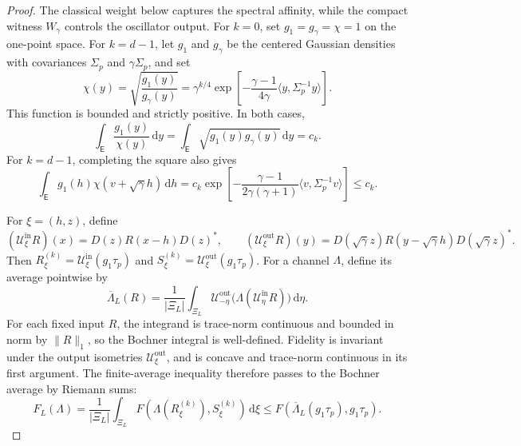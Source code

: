 \documentclass[11pt]{article}
\theoremstyle{remark}
\theoremstyle{plain}
\newcommand{\dd}{\mathrm d}
\begin{document}
\begin{proof}
The classical weight below captures the spectral
affinity, while the compact witness \(W_\gamma\) controls the oscillator
output.
For \(k=0\), set \(g_1=g_\gamma=\chi=1\) on the one-point space.  For
\(k=d-1\), let \(g_1\) and \(g_\gamma\) be the centered Gaussian densities
with covariances \(\Sigma_p\) and \(\gamma\Sigma_p\), and set
\[
  \chi(y)=\sqrt{\frac{g_1(y)}{g_\gamma(y)}}
  =\gamma^{k/4}
   \exp\!\left[-\frac{\gamma-1}{4\gamma}
     \langle y,\Sigma_p^{-1}y\rangle\right].
\]
This function is bounded and strictly positive.  In both cases,
\begin{equation}\label{eq:classical-witness-identity}
  \int_{\mathsf E}\frac{g_1(y)}{\chi(y)}\,\dd y
  =\int_{\mathsf E}\sqrt{g_1(y)g_\gamma(y)}\,\dd y
  =c_k.
\end{equation}
For \(k=d-1\), completing the square also gives
\begin{equation}\label{eq:classical-witness-translation}
  \int_{\mathsf E}g_1(h)\chi(v+\sqrt\gamma h)\,\dd h
  =c_k\exp\!\left[-\frac{\gamma-1}{2\gamma(\gamma+1)}
    \langle v,\Sigma_p^{-1}v\rangle\right]
  \le c_k.
\end{equation}

For \(\xi=(h,z)\), define
\[
  (\mathcal U_\xi^{\mathrm{in}}R)(x)
  =D(z)R(x-h)D(z)^*,
  \qquad
  (\mathcal U_\xi^{\mathrm{out}}R)(y)
  =D(\sqrt\gamma z)R(y-\sqrt\gamma h)D(\sqrt\gamma z)^*.
\]
Then
\(R_\xi^{(k)}=\mathcal U_\xi^{\mathrm{in}}(g_1\tau_p)\) and
\(S_\xi^{(k)}=\mathcal U_\xi^{\mathrm{out}}(g_1\tau_p)\).  For a channel
\(\Lambda\), define its average pointwise by
\[
  \overline\Lambda_L(R)
  =\frac1{|\Xi_L|}\int_{\Xi_L}
   \mathcal U_{-\eta}^{\mathrm{out}}
   \bigl(\Lambda(\mathcal U_\eta^{\mathrm{in}}R)\bigr)\,\dd\eta.
\]
For each fixed input \(R\), the integrand is trace-norm continuous and
bounded in norm by \(\|R\|_1\), so the Bochner integral is well-defined.
Fidelity is invariant under the output isometries
\(\mathcal U_\xi^{\mathrm{out}}\), and is concave and trace-norm continuous
in its first argument. The finite-average inequality therefore passes
to the Bochner average by Riemann sums:
\begin{equation}\label{eq:unified-folner-concavity}
  F_L(\Lambda)
  =\frac1{|\Xi_L|}\int_{\Xi_L}
  F\!\left(\Lambda(R_\xi^{(k)}),S_\xi^{(k)}\right)\,\dd\xi
  \le F(\overline\Lambda_L(g_1\tau_p),g_1\tau_p).
\end{equation}


\end{proof}
\end{document}
